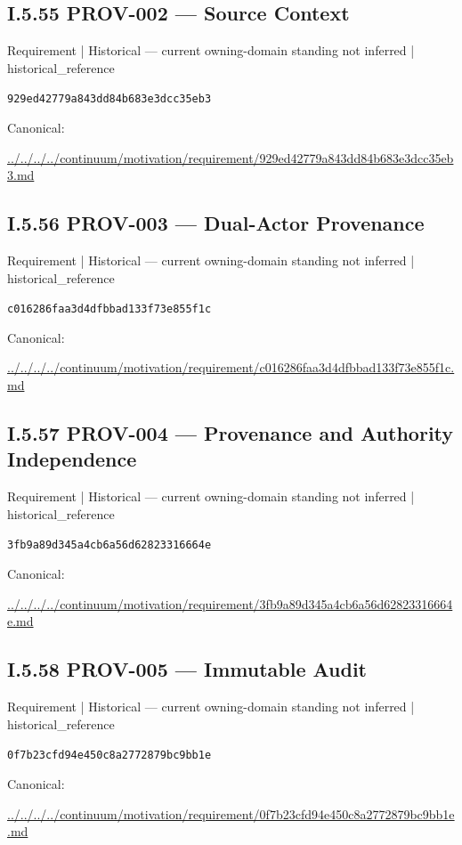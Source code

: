 \documentclass[10pt,a4paper]{article}
\begin{document}
\subsection*{I.5.55 PROV-002 — Source Context}
{\small Requirement | Historical — current owning-domain standing not inferred | historical\_reference}\par
\texttt{929ed42779a843dd84b683e3dcc35eb3}\par
Canonical: \par
{\footnotesize\url{../../../../continuum/motivation/requirement/929ed42779a843dd84b683e3dcc35eb3.md}}\par
\subsection*{I.5.56 PROV-003 — Dual-Actor Provenance}
{\small Requirement | Historical — current owning-domain standing not inferred | historical\_reference}\par
\texttt{c016286faa3d4dfbbad133f73e855f1c}\par
Canonical: \par
{\footnotesize\url{../../../../continuum/motivation/requirement/c016286faa3d4dfbbad133f73e855f1c.md}}\par
\subsection*{I.5.57 PROV-004 — Provenance and Authority Independence}
{\small Requirement | Historical — current owning-domain standing not inferred | historical\_reference}\par
\texttt{3fb9a89d345a4cb6a56d62823316664e}\par
Canonical: \par
{\footnotesize\url{../../../../continuum/motivation/requirement/3fb9a89d345a4cb6a56d62823316664e.md}}\par
\subsection*{I.5.58 PROV-005 — Immutable Audit}
{\small Requirement | Historical — current owning-domain standing not inferred | historical\_reference}\par
\texttt{0f7b23cfd94e450c8a2772879bc9bb1e}\par
Canonical: \par
{\footnotesize\url{../../../../continuum/motivation/requirement/0f7b23cfd94e450c8a2772879bc9bb1e.md}}\par
\end{document}
